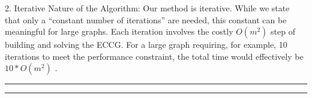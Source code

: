 \documentclass[10pt,journal, compsoc]{IEEEtran}
\begin{document}
2. Iterative Nature of the Algorithm: Our method is iterative. While we state that only a ``constant number of iterations'' are needed, this constant can be meaningful for large graphs. Each iteration involves the costly $O(m^2)$  step of building and solving the ECCG. For a large graph requiring, for example, 10 iterations to meet the performance constraint, the total time would effectively be $10*O(m^2)$ .








\noindent\rule[0.25\baselineskip]{252pt}{1pt}
\noindent\rule[0.25\baselineskip]{252pt}{1pt}

\end{document}
